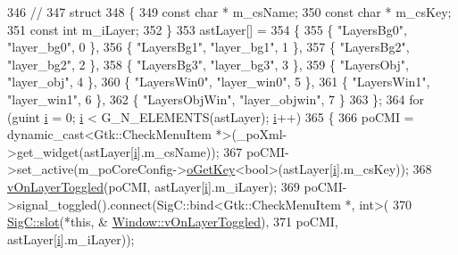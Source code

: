 \begin{DoxyCode}
{{346   \textcolor{comment}{//}
347   \textcolor{keyword}{struct}
348   \{
349     \textcolor{keyword}{const} \textcolor{keywordtype}{char} * m\_csName;
350     \textcolor{keyword}{const} \textcolor{keywordtype}{char} * m\_csKey;
351     \textcolor{keyword}{const} \textcolor{keywordtype}{int}    m\_iLayer;
352   \}
353   astLayer[] =
354   \{
355     \{ \textcolor{stringliteral}{"LayersBg0"},    \textcolor{stringliteral}{"layer\_bg0"},    0 \},
356     \{ \textcolor{stringliteral}{"LayersBg1"},    \textcolor{stringliteral}{"layer\_bg1"},    1 \},
357     \{ \textcolor{stringliteral}{"LayersBg2"},    \textcolor{stringliteral}{"layer\_bg2"},    2 \},
358     \{ \textcolor{stringliteral}{"LayersBg3"},    \textcolor{stringliteral}{"layer\_bg3"},    3 \},
359     \{ \textcolor{stringliteral}{"LayersObj"},    \textcolor{stringliteral}{"layer\_obj"},    4 \},
360     \{ \textcolor{stringliteral}{"LayersWin0"},   \textcolor{stringliteral}{"layer\_win0"},   5 \},
361     \{ \textcolor{stringliteral}{"LayersWin1"},   \textcolor{stringliteral}{"layer\_win1"},   6 \},
362     \{ \textcolor{stringliteral}{"LayersObjWin"}, \textcolor{stringliteral}{"layer\_objwin"}, 7 \}
363   \};
364   \textcolor{keywordflow}{for} (guint \mbox{\hyperlink{expr-lex_8cpp_acb559820d9ca11295b4500f179ef6392}{i}} = 0; \mbox{\hyperlink{expr-lex_8cpp_acb559820d9ca11295b4500f179ef6392}{i}} < G\_N\_ELEMENTS(astLayer); \mbox{\hyperlink{expr-lex_8cpp_acb559820d9ca11295b4500f179ef6392}{i}}++)
365   \{
366     poCMI = \textcolor{keyword}{dynamic\_cast<}Gtk::CheckMenuItem *\textcolor{keyword}{>}(\_poXml->get\_widget(astLayer[\mbox{\hyperlink{expr-lex_8cpp_acb559820d9ca11295b4500f179ef6392}{i}}].m\_csName));
367     poCMI->set\_active(m\_poCoreConfig->\mbox{\hyperlink{class_v_b_a_1_1_config_1_1_section_ab169d7aae4e9dde91418ba1668e3ad39}{oGetKey}}<\textcolor{keywordtype}{bool}>(astLayer[\mbox{\hyperlink{expr-lex_8cpp_acb559820d9ca11295b4500f179ef6392}{i}}].m\_csKey));
368     \mbox{\hyperlink{class_v_b_a_1_1_window_aabcf3fafc945b040ac1f775cb32a7245}{vOnLayerToggled}}(poCMI, astLayer[\mbox{\hyperlink{expr-lex_8cpp_acb559820d9ca11295b4500f179ef6392}{i}}].m\_iLayer);
369     poCMI->signal\_toggled().connect(SigC::bind<Gtk::CheckMenuItem *, int>(
370                                       \mbox{\hyperlink{namespace_sig_c_a92e4f19202b77e78ac1db05f5a62f6b6}{SigC::slot}}(*\textcolor{keyword}{this}, &
      \mbox{\hyperlink{class_v_b_a_1_1_window_aabcf3fafc945b040ac1f775cb32a7245}{Window::vOnLayerToggled}}),
371                                       poCMI, astLayer[\mbox{\hyperlink{expr-lex_8cpp_acb559820d9ca11295b4500f179ef6392}{i}}].m\_iLayer));
}}
\end{DoxyCode}
